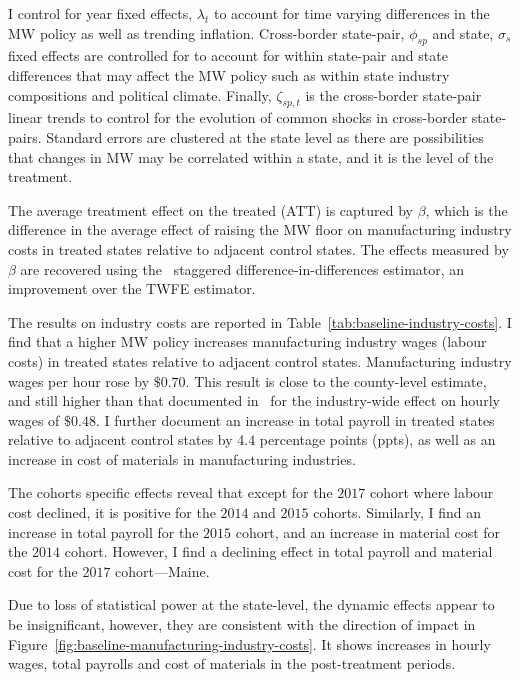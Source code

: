 \documentclass{C:/Users/david/OneDrive/Documents/ULMS/PhD/Thesis/chapter3/src/climate_change/latex/Economic_Journal/OUP-EJ}
\begin{document}
    I control for year fixed effects, $\lambda_{t}$ to account for time varying differences in the MW policy as well as trending inflation. Cross-border state-pair, $\phi_{sp}$ and state, $\sigma_{s}$ fixed effects are controlled for to account for within state-pair and state differences that may affect the MW policy such as within state industry compositions and political climate. Finally, $\zeta_{sp,t}$ is the cross-border state-pair linear trends to control for the evolution of common shocks in cross-border state-pairs. Standard errors are clustered at the state level as there are possibilities that changes in MW may be correlated within a state, and it is the level of the treatment.
    

    The average treatment effect on the treated (ATT) is captured by $\beta$, which is the difference in the average effect of raising the MW floor on manufacturing industry costs in treated states relative to adjacent control states. The effects measured by $\beta$ are recovered using the~\citet{sun2021estimating} staggered difference-in-differences estimator, an improvement over the TWFE estimator.

    The results on industry costs are reported in Table~\ref{tab:baseline-industry-costs}. I find that a higher MW policy increases manufacturing industry wages (labour costs) in treated states relative to adjacent control states. Manufacturing industry wages per hour rose by $\$0.70$. This result is close to the county-level estimate, and still higher than that documented in~\citet{gopalan2021state} for the industry-wide effect on hourly wages of $\$0.48$. I further document an increase in total payroll in treated states relative to adjacent control states by $4.4$ percentage points (ppts), as well as an increase in cost of materials in manufacturing industries.

    The cohorts specific effects reveal that except for the $2017$ cohort where labour cost declined, it is positive for the $2014$ and $2015$ cohorts. Similarly, I find an increase in total payroll for the $2015$ cohort, and an increase in material cost for the $2014$ cohort. However, I find a declining effect in total payroll and material cost for the $2017$ cohort---Maine.
    
    

    Due to loss of statistical power at the state-level, the dynamic effects appear to be insignificant, however, they are consistent with the direction of impact in Figure~\ref{fig:baseline-manufacturing-industry-costs}. It shows increases in hourly wages, total payrolls and cost of materials in the post-treatment periods.
\end{document}
